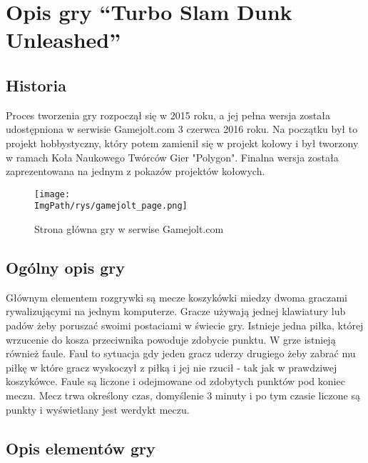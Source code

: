 \documentclass[a4paper,12pt,twoside,openany]{report}
\newcommand{\ImgPath}{.}
\begin{document}
\chapter{Opis gry “Turbo Slam Dunk Unleashed”}

\section{Historia}

Proces tworzenia gry rozpoczął się w 2015 roku, a jej pełna wersja została udostępniona w serwisie Gamejolt.com 3 czerwca 2016 roku. Na początku był to projekt hobbystyczny, który potem zamienił się w projekt kołowy i był tworzony w ramach Koła Naukowego Twórców Gier "Polygon". Finalna wersja została zaprezentowana na jednym z pokazów projektów kołowych.
\begin{figure}[!htbp]
	\begin{center}
\centering
\texttt{[image: \\ImgPath/rys/gamejolt\_page.png]}
\end{center}
	\caption{Strona główna gry w serwise Gamejolt.com}
	\label{gamejolt_page}
\end{figure}

\section{Ogólny opis gry}
Głównym elementem rozgrywki są mecze koszykówki miedzy dwoma graczami rywalizującymi na jednym komputerze. Gracze używają jednej klawiatury lub padów żeby poruszać swoimi postaciami w świecie gry. Istnieje jedna piłka, której wrzucenie do kosza przeciwnika powoduje zdobycie punktu. W grze istnieją również faule. Faul to sytuacja gdy jeden gracz uderzy drugiego żeby zabrać mu piłkę  w które gracz wyskoczył z piłką i jej nie rzucił - tak jak w prawdziwej koszykówce. Faule są liczone i odejmowane od zdobytych punktów pod koniec meczu. Mecz trwa określony czas, domyślenie 3 minuty i po tym czasie liczone są punkty i wyświetlany jest werdykt meczu.

\section{Opis elementów gry}
\end{document}
